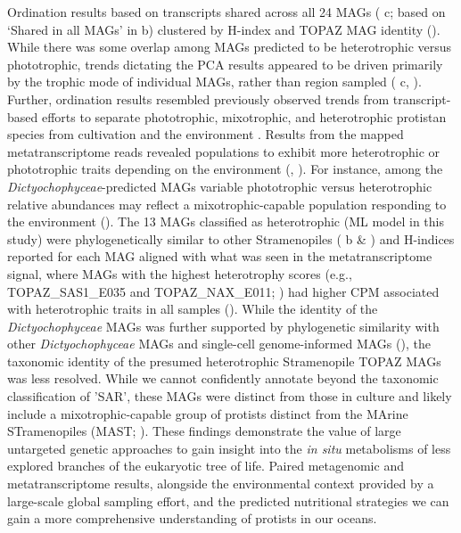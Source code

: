 \documentclass[12pt]{article}
\numberwithin{equation}{section}
\begin{document}
Ordination results based on transcripts shared across all 24 MAGs ( c; based on ‘Shared in all MAGs’ in b) clustered by H-index and TOPAZ MAG identity (). While there was some overlap among MAGs predicted to be heterotrophic versus phototrophic, trends dictating the PCA results appeared to be driven primarily by the trophic mode of individual MAGs, rather than region sampled ( c, ). Further, ordination results resembled previously observed trends from transcript-based efforts to separate phototrophic, mixotrophic, and heterotrophic protistan species from cultivation \citep{koid2014po, beisser2017p} and the environment \citep{hu2018}. Results from the mapped metatranscriptome reads revealed populations to exhibit more heterotrophic or phototrophic traits depending on the environment (, ). For instance, among the \textit{Dictyochophyceae}-predicted MAGs variable phototrophic versus heterotrophic relative abundances may reflect a mixotrophic-capable population responding to the environment (). The 13 MAGs classified as heterotrophic (ML model in this study) were phylogenetically similar to  other Stramenopiles ( b \& ) and H-indices reported for each MAG aligned with what was seen in the metatranscriptome signal, where MAGs with the highest heterotrophy scores (e.g., TOPAZ\_SAS1\_E035 and TOPAZ\_NAX\_E011; ) had higher CPM associated with heterotrophic traits in all samples (). While the identity of the \textit{Dictyochophyceae} MAGs was further supported by phylogenetic similarity with other \textit{Dictyochophyceae} MAGs and single-cell genome-informed MAGs (), the taxonomic identity of the presumed heterotrophic Stramenopile TOPAZ MAGs was less resolved. While we cannot confidently annotate beyond the taxonomic classification of 'SAR', these MAGs were distinct from those in culture and likely include a mixotrophic-capable group of protists distinct from the MArine STramenopiles (MAST; ). These findings demonstrate the value of large untargeted genetic approaches to gain insight into the \textit{in situ} metabolisms of less explored branches of the eukaryotic tree of life. Paired metagenomic and metatranscriptome results, alongside the environmental context provided by a large-scale global sampling effort, and the predicted nutritional strategies we can gain a more comprehensive understanding of protists in our oceans.
\end{document}
